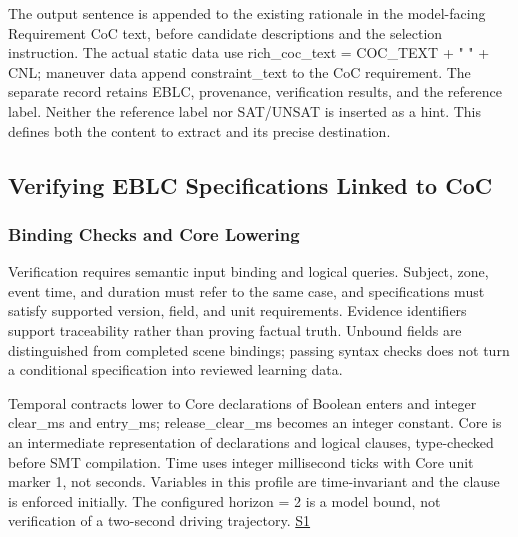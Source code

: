 \documentclass[nolineno]{ieeeaccess}
\begin{document}
The output sentence is appended to the existing rationale in the model-facing {\ttfamily{}\selectfont\footnotesize Requirement CoC} text, before candidate descriptions and the selection instruction. The actual static data use {\ttfamily{}\selectfont\footnotesize rich\_\allowbreak coc\_\allowbreak text = COC\_\allowbreak TEXT + " " + CNL}; maneuver data append {\ttfamily{}\selectfont\footnotesize constraint\_\allowbreak text} to the CoC requirement. The separate record retains EBLC, provenance, verification results, and the reference label. Neither the reference label nor SAT/UNSAT is inserted as a hint. This defines both the content to extract and its precise destination.\par

\subsection{Verifying EBLC Specifications Linked to CoC}

\subsubsection{Binding Checks and Core Lowering}

Verification requires semantic input binding and logical queries. Subject, zone, event time, and duration must refer to the same case, and specifications must satisfy supported version, field, and unit requirements. Evidence identifiers support traceability rather than proving factual truth. Unbound fields are distinguished from completed scene bindings; passing syntax checks does not turn a conditional specification into reviewed learning data.\par

Temporal contracts lower to Core declarations of Boolean {\ttfamily{}\selectfont\footnotesize enters} and integer {\ttfamily{}\selectfont\footnotesize clear\_\allowbreak ms} and {\ttfamily{}\selectfont\footnotesize entry\_\allowbreak ms}; {\ttfamily{}\selectfont\footnotesize release\_\allowbreak clear\_\allowbreak ms} becomes an integer constant. Core is an intermediate representation of declarations and logical clauses, type-checked before SMT compilation. Time uses integer millisecond ticks with Core unit marker {\ttfamily{}\selectfont\footnotesize 1}, not seconds. Variables in this profile are time-invariant and the clause is enforced initially. The configured {\ttfamily{}\selectfont\footnotesize horizon = 2} is a model bound, not verification of a two-second driving trajectory. \href{\detokenize{projects/04-guardsynth-coc/experiments/paper1_cnl_learning/temporal_preservation.py}}{S1}\par
\end{document}

